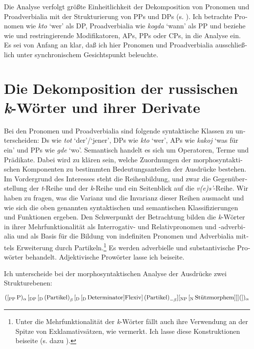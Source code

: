 \documentclass[output=paper, colorlinks, citecolor=brown, booklanguage=german]{langscibook}
\begin{document}
\begin{otherlanguage}{german}
Die Analyse verfolgt größte Einheitlichkeit der Dekomposition von Pronomen und Proadverbialia mit der Strukturierung von PPs und DPs (s. \citealt{Steube.Spaeth1998,Zimmermann1999}). Ich betrachte Pronomen wie \textit{kto} `wer' als DP, Proadverbialia wie \textit{kogda} `wann' als PP und beziehe wie \citet{Lenerz1993} und \citet{Cardinaletti1994} restringierende Modifikatoren, APs, PPs oder CPs, in die Analyse ein. Es sei von Anfang an klar, daß ich hier Pronomen und Proadverbialia ausschließlich unter synchronischem Gesichtspunkt beleuchte.

\section{Die Dekomposition der russischen \textit{k}-Wörter und ihrer Derivate} \label{analyse}

Bei den Pronomen und Proadverbialia sind folgende syntaktische Klassen zu unterscheiden: Ds wie \textit{tot} `der'/`jener', DPs wie \textit{kto} `wer', APs wie \textit{kakoj} `was für ein' und PPs wie \textit{gde} `wo'. Semantisch handelt es sich um Operatoren, Terme und Prädikate. Dabei wird zu klären sein, welche Zuordnungen der morpho\-syn\-takti\-schen Komponenten zu bestimmten Bedeutungsanteilen der Ausdrücke bestehen. Im Vordergrund des Interesses steht die Reihenbildung, und zwar die Gegenüberstellung der \textit{t}-Reihe und der \textit{k}-Reihe und ein Seitenblick auf die \textit{v(e)s'}-Reihe. Wir haben zu fragen, was die Varianz und die Invarianz dieser Reihen ausmacht und wie sich die oben genannten syntaktischen und semantischen Klassifizierungen und Funktionen ergeben. Den Schwerpunkt der Betrachtung bilden die \textit{k}-Wörter in ihrer Mehrfunktionalität als Interrogativ- und Relativpronomen und -adverbialia und als Basis für die Bildung von indefiniten Pronomen und Adverbialia mittels Erweiterung durch Partikeln.\footnote{Unter die Mehrfunktionalität der \textit{k}-Wörter fällt auch ihre Verwendung an der Spitze von Ex\-kla\-mativ\-sätzen, wie \citet[157]{Peskovskij1956} vermerkt. Ich lasse diese Konstruktionen beiseite (s. dazu \citealt{Zybatow1990}).} Es werden adverbielle und substantivische Prowörter behandelt. Adjektivische Prowörter lasse ich beiseite.

Ich unterscheide bei der morphosyntaktischen Analyse der Ausdrücke zwei Strukturebenen:

\ea\label{ex:02:strukturebenen}
    \ea\label{ex:02:strukturebenen-a} $([_\textrm{PP}\, \textrm{P})_{\alpha}\, [_\textrm{DP}\, [_\textrm{D}\, \textrm{(Partikel)}_{\beta}\, [_\textrm{D}\, [_\textrm{D}\, \textrm{Determinator} ] \newline \textrm{Flexiv} ]\, \textrm{(Partikel)}_{-\beta} ] [_\textrm{NP}\, [_\textrm{N}\, \textrm{Stützmorphem} ]]](])_{\alpha}$
    

\end{otherlanguage}
\end{document}
